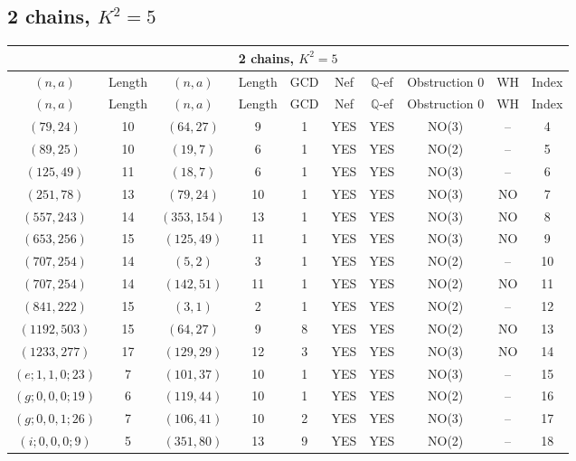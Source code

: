 \subsection{2 chains, $K^2 = 5$}
\begin{longtable}{|c|c|c|c|c|c|c|c|c|c|}
\hline
\multicolumn{10}{|c|}{2 chains, $K^2 = 5$}\\
\hline
$(n,a)$ & Length & $(n,a)$ & Length & GCD & Nef & $\mathbb Q$-ef & Obstruction 0 & WH & Index\\
\hline
\endfirsthead

\hline
$(n,a)$ & Length & $(n,a)$ & Length & GCD & Nef & $\mathbb Q$-ef & Obstruction 0 & WH & Index\\
\hline
\endhead
\hline
\endfoot

$(79, 24)$ & 10 & $(64, 27)$ & 9 & 1 & YES & YES & NO(3) & -- & 4\\
$(89, 25)$ & 10 & $(19, 7)$ & 6 & 1 & YES & YES & NO(2) & -- & 5\\
$(125, 49)$ & 11 & $(18, 7)$ & 6 & 1 & YES & YES & NO(3) & -- & 6\\
$(251, 78)$ & 13 & $(79, 24)$ & 10 & 1 & YES & YES & NO(3) & NO & 7\\
$(557, 243)$ & 14 & $(353, 154)$ & 13 & 1 & YES & YES & NO(3) & NO & 8\\
$(653, 256)$ & 15 & $(125, 49)$ & 11 & 1 & YES & YES & NO(3) & NO & 9\\
$(707, 254)$ & 14 & $(5, 2)$ & 3 & 1 & YES & YES & NO(2) & -- & 10\\
$(707, 254)$ & 14 & $(142, 51)$ & 11 & 1 & YES & YES & NO(2) & NO & 11\\
$(841, 222)$ & 15 & $(3, 1)$ & 2 & 1 & YES & YES & NO(2) & -- & 12\\
$(1192, 503)$ & 15 & $(64, 27)$ & 9 & 8 & YES & YES & NO(2) & NO & 13\\
$(1233, 277)$ & 17 & $(129, 29)$ & 12 & 3 & YES & YES & NO(3) & NO & 14\\
$(e; 1, 1, 0; 23)$ & 7 & $(101, 37)$ & 10 & 1 & YES & YES & NO(3) & -- & 15\\
$(g; 0, 0, 0; 19)$ & 6 & $(119, 44)$ & 10 & 1 & YES & YES & NO(2) & -- & 16\\
$(g; 0, 0, 1; 26)$ & 7 & $(106, 41)$ & 10 & 2 & YES & YES & NO(3) & -- & 17\\
$(i; 0, 0, 0; 9)$ & 5 & $(351, 80)$ & 13 & 9 & YES & YES & NO(2) & -- & 18
\end{longtable}
